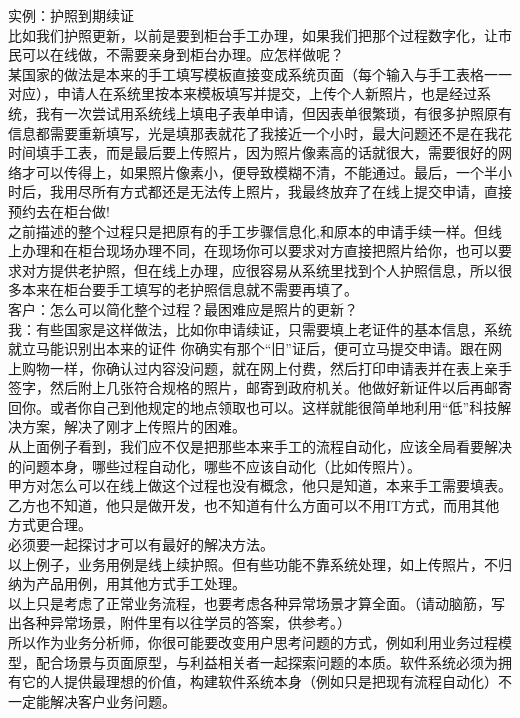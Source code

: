 实例：护照到期续证\\
比如我们护照更新，以前是要到柜台手工办理，如果我们把那个过程数字化，让市民可以在线做，不需要亲身到柜台办理。应怎样做呢？\\
某国家的做法是本来的手工填写模板直接变成系统页面（每个输入与手工表格一一对应），申请人在系统里按本来模板填写并提交，上传个人新照片，也是经过系统，我有一次尝试用系统线上填电子表单申请，但因表单很繁琐，有很多护照原有信息都需要重新填写，光是填那表就花了我接近一个小时，最大问题还不是在我花时间填手工表，而是最后要上传照片，因为照片像素高的话就很大，需要很好的网络才可以传得上，如果照片像素小，便导致模糊不清，不能通过。最后，一个半小时后，我用尽所有方式都还是无法传上照片，我最终放弃了在线上提交申请，直接预约去在柜台做!\\
之前描述的整个过程只是把原有的手工步骤信息化,和原本的申请手续一样。但线上办理和在柜台现场办理不同，在现场你可以要求对方直接把照片给你，也可以要求对方提供老护照，但在线上办理，应很容易从系统里找到个人护照信息，所以很多本来在柜台要手工填写的老护照信息就不需要再填了。\\
客户：怎么可以简化整个过程？最困难应是照片的更新？\\
我：有些国家是这样做法，比如你申请续证，只需要填上老证件的基本信息，系统就立马能识别出本来的证件
你确实有那个``旧''证后，便可立马提交申请。跟在网上购物一样，你确认过内容没问题，就在网上付费，然后打印申请表并在表上亲手签字，然后附上几张符合规格的照片，邮寄到政府机关。他做好新证件以后再邮寄回你。或者你自己到他规定的地点领取也可以。这样就能很简单地利用``低''科技解决方案，解决了刚才上传照片的困难。\\
从上面例子看到，我们应不仅是把那些本来手工的流程自动化，应该全局看要解决的问题本身，哪些过程自动化，哪些不应该自动化（比如传照片）。\\
甲方对怎么可以在线上做这个过程也没有概念，他只是知道，本来手工需要填表。\\
乙方也不知道，他只是做开发，也不知道有什么方面可以不用IT方式，而用其他方式更合理。\\
必须要一起探讨才可以有最好的解决方法。\\
以上例子，业务用例是线上续护照。但有些功能不靠系统处理，如上传照片，不归纳为产品用例，用其他方式手工处理。\\
以上只是考虑了正常业务流程，也要考虑各种异常场景才算全面。（请动脑筋，写出各种异常场景，附件里有以往学员的答案，供参考。）\\
所以作为业务分析师，你很可能要改变用户思考问题的方式，例如利用业务过程模型，配合场景与页面原型，与利益相关者一起探索问题的本质。软件系统必须为拥有它的人提供最理想的价值，构建软件系统本身（例如只是把现有流程自动化）不一定能解决客户业务问题。

